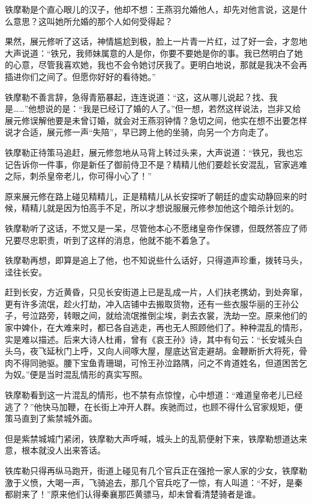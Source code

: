 \documentclass[12pt,oneside]{book}
\begin{document}
铁摩勒是个直心眼儿的汉子，他却不想：王燕羽允婚他人，却先对他言说，这是什么意思？这叫她所允婚的那个人如何受得起？

果然，展元修听了这话，神情尴尬到极，脸上一片青一片红，过了好一会，才忽地大声说道：``铁兄，我师妹属意的人是你，你要不要她是你的事。我已然明白了她的心意，尽管我喜欢她，我也不会令她讨厌我了。更明白地说，那就是我决不会再插进你们之间了。但愿你好好的看待她。''

铁摩勒不善言辞，急得青筋暴起，连连说道：``这，这从哪儿说起？找、我是\ldots\ldots{}''他想说的是：``我是已经订了婚的人了。''但一想，若然这样说法，岂非又给展元修误解他要是未曾订婚，就会对王燕羽钟情？急切之间，他实在想不出要怎样说才合适，展元修一声``失陪''，早已跨上他的坐骑，向另一个方向走了。

铁摩勒正待策马追赶，展元修忽地从马背上转过头来，大声说道：``铁兄，我也忘记告诉你一件事，你是新任了御前侍卫不是？精精儿他们要趁长安混乱，官家逃难之际，刺杀皇帝老儿，你可得小心了！''

原来展元修在路上碰见精精儿，正是精精儿从长安探听了朝廷的虚实动静回来的时候，精精儿就是因为怕高手不足，所以才想说服展元修参加他这个暗杀计划的。

铁摩勒听了这话，不觉又是一呆，尽管他本心不愿绪皇帝作保镖，但既然答应了师兄要尽忠职责，听到了这样的消息，他就不能不着急了。

铁摩勒再想，即算是追上了他，也不知说些什么话好，只得道声珍重，拨转马头，迳往长安。

赶到长安，方近黄昏，只见长安街道上已是乱成一片，人们扶老携幼，到处奔窜，更有许多流氓，趁火打劫，冲入店铺中去搬取货物，还有一些衣服华丽的王孙公子，号泣路旁，转眼之间，就给流氓推倒尘埃，剥去衣裳，洗劫一空。原来他们的家中婢仆，在大难来时，都已各自逃走，再也无人照顾他们了。种种混乱的情形，实是难以描述。后来大诗人杜甫，曾有《哀王孙》诗，其中有句云：``长安城头白头乌，夜飞延秋门上呼，又向人间啄大屋，屋底达官走避胡。金鞭断折大将死，骨肉不得同驰驱。腰下宝鱼青珊瑚，可怜王孙泣路隅，问之不肯道姓名，但道困苦乞为奴。''便是当时混乱情形的真实写照。

铁摩勒看到这一片混乱的情形，也不禁有点惊惶，心中想道：``难道皇帝老儿已经逃了？''他快马加鞭，在长街上冲开人群。疾驰而过，也顾不得什么官家规矩，便策马直到了紫禁城外面。

但是紫禁城城门紧闭，铁摩勒大声呼喊，城头上的乱箭便射下来，铁摩勒想道达来意，根本就没人出来答话。

铁库勒只得再纵马跑开，街道上碰见有几个官兵正在强抢一家人家的少女，铁摩勒激于义愤，大喝一声，飞骑追去，那几个官兵吃了一惊，有人叫道：``不好，是秦都尉来了！''原来他们认得秦襄那匹黄骠马，却未曾看清楚骑者是谁。
\end{document}
